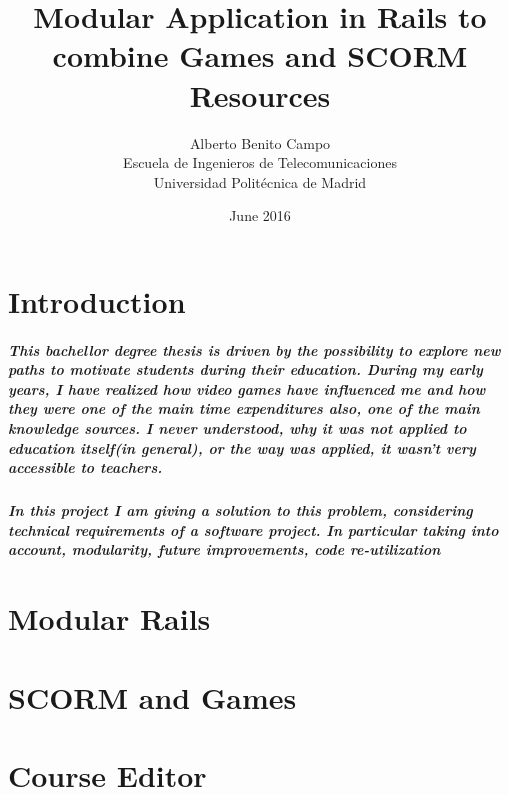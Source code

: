 \documentclass{book}
\title{Modular Application in Rails to combine Games and SCORM Resources}
\author{Alberto Benito Campo\\Escuela de Ingenieros de Telecomunicaciones\\Universidad Politécnica de Madrid}
\date{June 2016}
\begin{document}
\begin{titlepage}
\maketitle
\end{titlepage}

\chapter{Introduction}
\paragraph{This bachellor degree thesis is driven by the possibility to explore new paths to motivate students during their education. During my early years, I have realized how video games have influenced me and how they were one of the main time expenditures also, one of the main knowledge sources. I never understood, why it was not applied to education itself(in general), or the way was applied, it wasn't very accessible to teachers.}

\paragraph{In this project I am giving a solution to this problem, considering technical requirements of a software project. In particular taking into account, modularity, future improvements, code re-utilization}
\chapter{Modular Rails}


\chapter{SCORM and Games}


\chapter{Course Editor}
\end{document}
